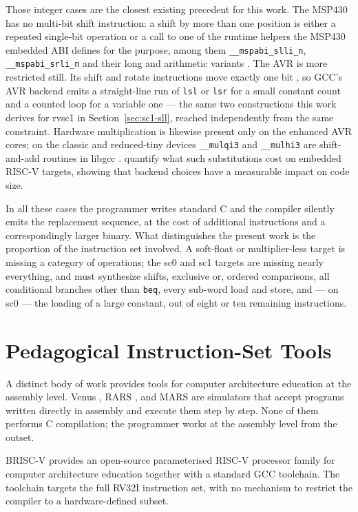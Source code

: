 Those integer cases are the closest existing precedent for this work. The MSP430 has no multi-bit shift
instruction: a shift by more than one position is either a repeated single-bit operation or a call to
one of the runtime helpers the MSP430 embedded ABI defines for the purpose, among them
\texttt{\_\_mspabi\_slli\_n}, \texttt{\_\_mspabi\_srli\_n} and their long and arithmetic variants
\cite{msp430-eabi,msp430-ug}. The AVR is more restricted still. Its shift and rotate instructions move
exactly one bit \cite{avr-isa}, so GCC's AVR backend emits a straight-line run of \texttt{lsl} or
\texttt{lsr} for a small constant count and a counted loop for a variable one --- the same two
constructions this work derives for rvsc1 in Section~\ref{sec:sc1-sll}, reached independently from the
same constraint. Hardware multiplication is likewise present only on the enhanced AVR cores; on the
classic and reduced-tiny devices \texttt{\_\_mulqi3} and \texttt{\_\_mulhi3} are shift-and-add routines
in libgcc \cite{avr-isa}.  quantify what such substitutions cost on embedded
RISC-V targets, showing that backend choices have a measurable impact on code size.

In all these cases the programmer writes standard C and the compiler silently emits the replacement
sequence, at the cost of additional instructions and a correspondingly larger binary. What
distinguishes the present work is the proportion of the instruction set involved. A soft-float or
multiplier-less target is missing a category of operations; the sc0 and sc1 targets are missing nearly
everything, and must synthesize shifts, exclusive or, ordered comparisons, all conditional branches
other than \texttt{beq}, every sub-word load and store, and --- on sc0 --- the loading of a large
constant, out of eight or ten remaining instructions.

\section{Pedagogical Instruction-Set Tools}

A distinct body of work provides tools for computer architecture education at the assembly level. Venus
\cite{venus}, RARS \cite{rars}, and MARS \cite{mars} are simulators that accept programs written
directly in assembly and execute them step by step. None of them performs C compilation; the programmer
works at the assembly level from the outset.

BRISC-V \cite{brisc-v} provides an open-source parameterised RISC-V processor family for computer
architecture education together with a standard GCC toolchain. The toolchain targets the full RV32I
instruction set, with no mechanism to restrict the compiler to a hardware-defined subset.

